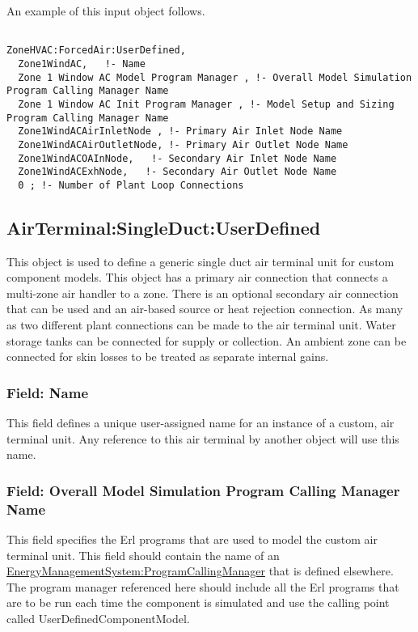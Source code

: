 An example of this input object follows.

\begin{lstlisting}

ZoneHVAC:ForcedAir:UserDefined,
  Zone1WindAC,   !- Name
  Zone 1 Window AC Model Program Manager , !- Overall Model Simulation Program Calling Manager Name
  Zone 1 Window AC Init Program Manager , !- Model Setup and Sizing Program Calling Manager Name
  Zone1WindACAirInletNode , !- Primary Air Inlet Node Name
  Zone1WindACAirOutletNode, !- Primary Air Outlet Node Name
  Zone1WindACOAInNode,   !- Secondary Air Inlet Node Name
  Zone1WindACExhNode,   !- Secondary Air Outlet Node Name
  0 ; !- Number of Plant Loop Connections
\end{lstlisting}

\subsection{AirTerminal:SingleDuct:UserDefined}\label{airterminalsingleductuserdefined}

This object is used to define a generic single duct air terminal unit for custom component models. This object has a primary air connection that connects a multi-zone air handler to a zone. There is an optional secondary air connection that can be used and an air-based source or heat rejection connection. As many as two different plant connections can be made to the air terminal unit. Water storage tanks can be connected for supply or collection. An ambient zone can be connected for skin losses to be treated as separate internal gains.

\subsubsection{Field: Name}\label{field-name-1-046}

This field defines a unique user-assigned name for an instance of a custom, air terminal unit. Any reference to this air terminal by another object will use this name.

\subsubsection{Field: Overall Model Simulation Program Calling Manager Name}\label{field-overall-model-simulation-program-calling-manager-name-1}

This field specifies the Erl programs that are used to model the custom air terminal unit. This field should contain the name of an \hyperref[energymanagementsystemprogramcallingmanager]{\hyperref[energymanagementsystemprogram]{EnergyManagementSystem:Program}CallingManager} that is defined elsewhere. The program manager referenced here should include all the Erl programs that are to be run each time the component is simulated and use the calling point called UserDefinedComponentModel.

